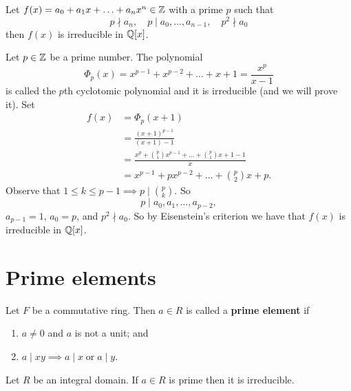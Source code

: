 
\begin{theorem}
    Let $f(x) = a_0 + a_1 x + \ldots + a_n x^n \in \mathbb{Z}$ with a prime $p$ such that
    \[ p \nmid a_n, \quad p \mid a_0, \ldots, a_{n - 1}, \quad p^2 \nmid a_0 \]
    then $f(x)$ is irreducible in $\mathbb{Q}[x]$.
\end{theorem}

\begin{example}
    Let $p \in \mathbb{Z}$ be a prime number. The polynomial
    \[ \Phi_p(x) = x^{p-1} + x^{p-2} + \ldots + x + 1 = \frac{x^p}{x - 1} \]
    is called the $p$th cyclotomic polynomial and it is irreducible (and we will prove it).
    Set 
    \begin{align*}
        f(x) &= \Phi_p(x + 1) \\
             &= \frac{(x + 1)^{p - 1}}{(x + 1) - 1} \\
             &= \frac{x^p + \binom{p}{1}x^{p - 1} + \ldots + \binom{p}{1}x + 1 - 1}{x} \\
             &= x^{p - 1} + px^{p - 2} + \ldots + \binom{p}{2}x + p.
    \end{align*}
    Observe that $1 \leq k \leq p - 1 \implies p \mid \binom pk$. So
    \[ p \mid a_0, a_1, \ldots, a_{p - 2}, \]
    $a_{p - 1} = 1$, $a_0 = p$, and $p^2 \nmid a_0$.
    So by Eisenstein's criterion we have that $f(x)$ is irreducible in $\mathbb{Q}[x]$.
\end{example}

\section{Prime elements}

\begin{definition}
    Let $F$ be a commutative ring. Then $a \in R$ is called a \textbf{prime element} if
    \begin{enumerate}
        \item $a \neq 0$ and $a$ is not a unit; and
        \item $a \mid xy \implies a \mid x \;\text{or}\; a \mid y$.
    \end{enumerate}
\end{definition}

\begin{proposition}[]
    Let $R$ be an integral domain. If $a \in R$ is prime then it is irreducible.
\end{proposition}

